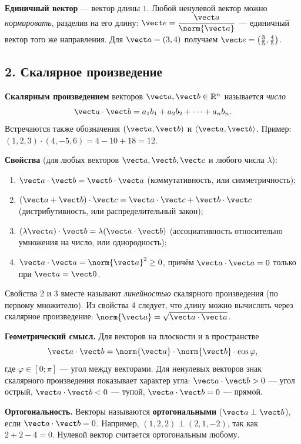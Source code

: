 \textbf{Единичный вектор} --- вектор длины $1$. Любой ненулевой вектор можно \emph{нормировать}, разделив на его длину: $\vect e=\dfrac{\vect a}{\norm{\vect a}}$ --- единичный вектор того же направления. Для $\vect a=(3,4)$ получаем $\vect e=\left(\frac35,\frac45\right)$.

\subsection*{2. Скалярное произведение}
\textbf{Скалярным произведением} векторов $\vect a,\vect b\in\mathbb R^n$ называется \emph{число}
\[
\vect a\cdot\vect b=a_1b_1+a_2b_2+\dots+a_nb_n .
\]
Встречаются также обозначения $(\vect a,\vect b)$ и $\langle\vect a,\vect b\rangle$. Пример: $(1,2,3)\cdot(4,-5,6)=4-10+18=12$.

\textbf{Свойства} (для любых векторов $\vect a,\vect b,\vect c$ и любого числа $\lambda$):
\begin{enumerate}
  \item $\vect a\cdot\vect b=\vect b\cdot\vect a$ (коммутативность, или симметричность);
  \item $(\vect a+\vect b)\cdot\vect c=\vect a\cdot\vect c+\vect b\cdot\vect c$ (дистрибутивность, или распределительный закон);
  \item $(\lambda\vect a)\cdot\vect b=\lambda(\vect a\cdot\vect b)$ (ассоциативность относительно умножения на число, или однородность);
  \item $\vect a\cdot\vect a=\norm{\vect a}^2\ge0$, причём $\vect a\cdot\vect a=0$ только при $\vect a=\vect 0$.
\end{enumerate}
Свойства 2 и 3 вместе называют \emph{линейностью} скалярного произведения (по первому множителю). Из свойства 4 следует, что длину можно вычислять через скалярное произведение: $\norm{\vect a}=\sqrt{\vect a\cdot\vect a}$.

\textbf{Геометрический смысл.} Для векторов на плоскости и в пространстве
\[
\vect a\cdot\vect b=\norm{\vect a}\cdot\norm{\vect b}\cdot\cos\varphi,
\]
где $\varphi\in[0;\pi]$ --- угол между векторами. Для ненулевых векторов знак скалярного произведения показывает характер угла: $\vect a\cdot\vect b>0$ --- угол острый, $\vect a\cdot\vect b<0$ --- тупой, $\vect a\cdot\vect b=0$ --- прямой.

\textbf{Ортогональность.} Векторы называются \textbf{ортогональными} ($\vect a\perp\vect b$), если $\vect a\cdot\vect b=0$. Например, $(1,2,2)\perp(2,1,-2)$, так как $2+2-4=0$. Нулевой вектор считается ортогональным любому.

